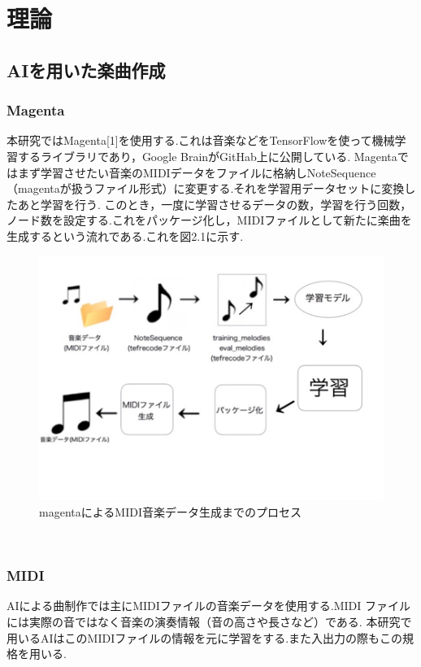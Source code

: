 \chapter{理論}
\section{AIを用いた楽曲作成}
\subsection{Magenta}
本研究ではMagenta[1]を使用する.これは音楽などをTensorFlowを使って機械学習するライブラリであり，Google BrainがGitHab上に公開している.
Magentaではまず学習させたい音楽のMIDIデータをファイルに格納しNoteSequence（magentaが扱うファイル形式）に変更する.それを学習用データセットに変換したあと学習を行う.
このとき，一度に学習させるデータの数，学習を行う回数，ノード数を設定する.これをパッケージ化し，MIDIファイルとして新たに楽曲を生成するという流れである.これを図2.1に示す.\\
\begin{figure}[h]
    \begin{screen}
    \begin{center}
        \includegraphics[scale=1.5, clip]{./img/magenta_usestep.png}
        \caption{magentaによるMIDI音楽データ生成までのプロセス}
        \label{fig:magentaによるMIDI音楽データ生成までのプロセス}
    \end{center}
    \end{screen}
\end{figure}\\
\newpage
\subsection{MIDI}
AIによる曲制作では主にMIDIファイルの音楽データを使用する.MIDI ファイルには実際の音ではなく音楽の演奏情報（音の高さや長さなど）である.
本研究で用いるAIはこのMIDIファイルの情報を元に学習をする.また入出力の際もこの規格を用いる.
